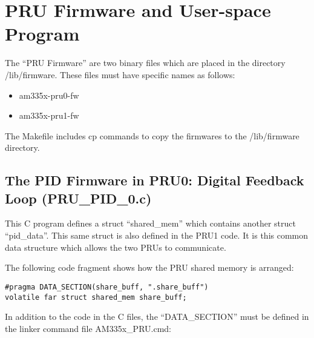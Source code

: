 %
%
%

\chapter{PRU Firmware and User-space Program}

The ``PRU Firmware'' are two binary files which are placed in the directory /lib/firmware.
These files must have specific names as follows:

\begin{itemize}
	\item am335x-pru0-fw
	\item am335x-pru1-fw
\end{itemize}

The Makefile includes cp commands to copy the firmwares to the /lib/firmware directory.

\section{The PID Firmware in PRU0:  Digital Feedback Loop (PRU\_PID\_0.c)}

This C program defines a struct ``shared\_mem'' which contains another struct ``pid\_data''. This same struct is also defined in the PRU1 code.  It is this common data structure which allows the two PRUs to communicate.

The following code fragment shows how the PRU shared memory is arranged:

\begin{verbatim}
#pragma DATA_SECTION(share_buff, ".share_buff")
volatile far struct shared_mem share_buff;
\end{verbatim}

In addition to the code in the C files, the ``DATA\_SECTION'' must be defined in the linker command file AM335x\_PRU.cmd:

